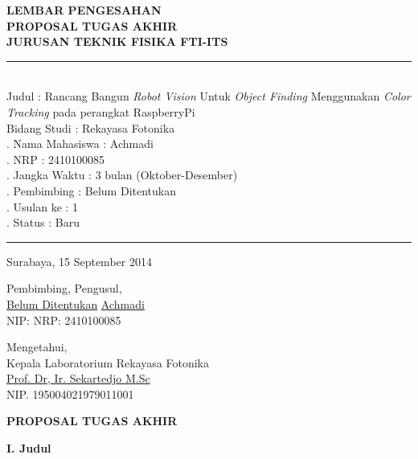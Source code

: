\documentclass[a4paper,12pt]{article}
\begin{document}
\newpage
\begin{center}
  \textbf{ LEMBAR PENGESAHAN  }\\[5pt]
  \textbf{ PROPOSAL TUGAS AKHIR  } \\[5pt]
  \textbf{ JURUSAN TEKNIK FISIKA FTI-ITS  }\\[5pt]
\end{center}
\rule{385pt}{5pt}\\
\noindent Judul \hspace{80pt} : Rancang Bangun \textit{Robot Vision} Untuk \textit{Object Finding} Menggunakan \textit{Color Tracking} pada perangkat RaspberryPi\\[5pt]
\noindent Bidang Studi \hspace{42pt} : Rekayasa Fotonika\\[5pt]
. Nama Mahasiswa \hspace{5pt} : Achmadi\\[5pt]
. NRP  \hspace{70pt} : 2410100085\\[5pt]
. Jangka Waktu \hspace{20pt} : 3 bulan (Oktober-Desember)\\[5pt]
. Pembimbing \hspace{28pt} : Belum Ditentukan\\[5pt]
. Usulan ke \hspace{40pt} : 1\\[5pt]
. Status \hspace{60pt} : Baru\\[5pt]
\rule{385pt}{5pt}
\begin{flushright}
  Surabaya, 15 September 2014
\end{flushright}
\begin{flushleft}
Pembimbing, \hspace{230pt} Pengusul, 
\\[40pt]
\underline{Belum Ditentukan} \hspace{200pt} \underline{Achmadi}\\
NIP:  \hspace{250pt} NRP: 2410100085
\\[40pt]
\end{flushleft}
\begin{center}
  Mengetahui,\\
  Kepala Laboratorium Rekayasa Fotonika
  \\[40pt]
  \underline{Prof. Dr, Ir. Sekartedjo M.Sc}\\
  NIP. 195004021979011001
\end{center}
\newpage
\begin{center}
 \textbf{PROPOSAL TUGAS AKHIR}
\end{center}
\noindent \textbf{I. \hspace{10pt} Judul}
\end{document}
